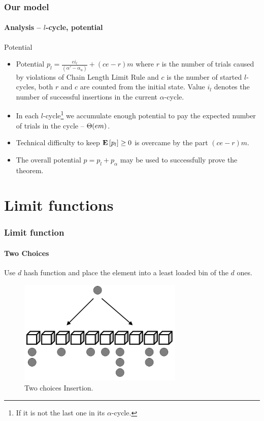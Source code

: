 \begin{frame}
	\frametitle{Our model}
	\framesubtitle{Analysis -- $l$-cycle, potential}
	
	\begin{block}{Potential}
		\begin{itemize}
			\item Potential $p_l = \frac{ei_{l}}{(\alpha' - \alpha_u)} + (ce - r) m$ where $r$ is the number of trials caused by violations of Chain Length Limit Rule and $c$ is the number of started $l$-cycles, both $r$ and $c$ are counted from the initial state. Value $i_l$ denotes the number of successful insertions in the current $\alpha$-cycle.
			\item In each $l$-cycle\footnote{If it is not the last one in its $\alpha$-cycle.} we accumulate enough potential to pay the expected number of trials in the cycle -- $\mathrm{\Theta}(em)$.
			\item Technical difficulty to keep $\mathbf{E}\left[p_l\right] \geq 0$ is overcame by the part $(ce - r)m$.
			\item The overall potential $p = p_l + p_\alpha$ may be used to successfully prove the theorem.
		\end{itemize}
	\end{block}
\end{frame}

\section{Limit functions}

\begin{frame}
	\frametitle{Limit function}
	\framesubtitle{Two Choices}
	
	Use $d$ hash function and place the element into a least loaded bin of the $d$ ones.
	
	\begin{figure}
		\includegraphics[width=0.7\textwidth]{two-choices.png}
		
		\caption{Two choices Insertion.}
	\end{figure}
\end{frame}

